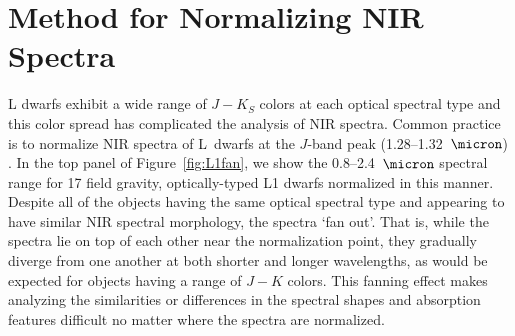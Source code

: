 \documentclass[12pt,preprint]{aastex}
\begin{document}
\clearpage
\section{Method for Normalizing NIR Spectra}
\label{sec:method}

L dwarfs exhibit a wide range of $J-K_S$ colors at each optical spectral type \cite[e.g.,]{Schmidt10, Faherty:2012cy} and this color spread has complicated the analysis of NIR spectra. 
Common practice is to normalize NIR spectra of L~dwarfs at the $J$-band peak (1.28--1.32~$\micron$) \citep[e.g.,][]{Kirkpatrick10}. 
In the top panel of Figure~\ref{fig:L1fan}, we show the 0.8--2.4~$\micron$ spectral range for 17 field gravity, optically-typed L1 dwarfs normalized in this manner.
Despite all of the objects having the same optical spectral type and appearing to have similar NIR spectral morphology, the spectra `fan out'. 
That is, while the spectra lie on top of each other near the normalization point, they gradually diverge from one another at both shorter and longer wavelengths, as would be expected for objects having a range of $J-K$ colors. 
This fanning effect makes analyzing the similarities or differences in the spectral shapes and absorption features difficult no matter where the spectra are normalized.

\end{document}
